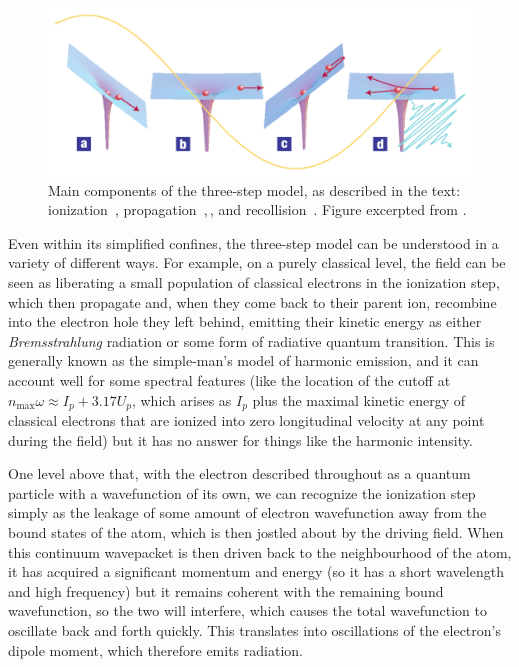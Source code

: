 \begin{figure}[htb]
  \centering
  \subfloat{\label{f7-corkum-three-step-model-a}}
  \subfloat{\label{f7-corkum-three-step-model-b}}
  \subfloat{\label{f7-corkum-three-step-model-c}}
  \subfloat{\label{f7-corkum-three-step-model-d}}
  \includegraphics[scale=1.2]{7-HHG-intro/Figures/figure7A.png}
  \caption[
  Essential components of the three-step model of HHG
  ]{
  Main components of the three-step model, as described in the text: ionization~\protect{}, propagation~\protect{},\,\protect{}, and recollision~\protect{}.
  Figure excerpted from .
  }
\label{f7-corkum-three-step-model}
\end{figure}


Even within its simplified confines, the three-step model can be understood in a variety of different ways. For example, on a purely classical level, the field can be seen as liberating a small population of classical electrons in the ionization step, which then propagate and, when they come back to their parent ion, recombine into the electron hole they left behind, emitting their kinetic energy as either \textit{Bremsstrahlung} radiation or some form of radiative quantum transition. This is generally known as the simple-man's model of harmonic emission, and it can account well for some spectral features (like the location of the cutoff at $n_\mathrm{max}\omega\approx I_p+3.17U_p$, which arises as $I_p$ plus the maximal kinetic energy of classical electrons that are ionized into zero longitudinal velocity at any point during the field) but it has no answer for things like the harmonic intensity.

One level above that, with the electron described throughout as a quantum particle with a wavefunction of its own, we can recognize the ionization step simply as the leakage of some amount of electron wavefunction away from the bound states of the atom, which is then jostled about by the driving field. When this continuum wavepacket is then driven back to the neighbourhood of the atom, it has acquired a significant momentum and energy (so it has a short wavelength and high frequency) but it remains coherent with the remaining bound wavefunction, so the two will interfere, which causes the total wavefunction to oscillate back and forth quickly. This translates into oscillations of the electron's dipole moment, which therefore emits radiation.



